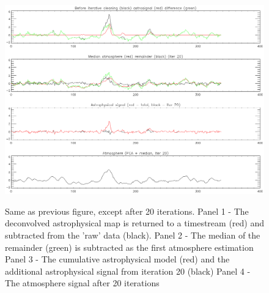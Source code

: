 \begin{figure}
  \begin{minipage}{6.5in}
    \begin{center}
      \includegraphics[scale=0.9]{iterative_mapping3}
      \caption{Same as previous figure, except after 20 iterations.
      Panel 1 - The deconvolved astrophysical map is returned to a timestream (red)
      and subtracted from the 'raw' data (black). 
      Panel 2 - The median of the remainder (green) is subtracted as the first
      atmosphere estimation
      Panel 3 - The cumulative astrophysical model (red) and the additional astrophysical
      signal from iteration 20 (black)
      Panel 4 - The atmosphere signal after 20 iterations}
    \end{center}
    \label{fig:IterativeMapping-c}
  \end{minipage}
\end{figure}


